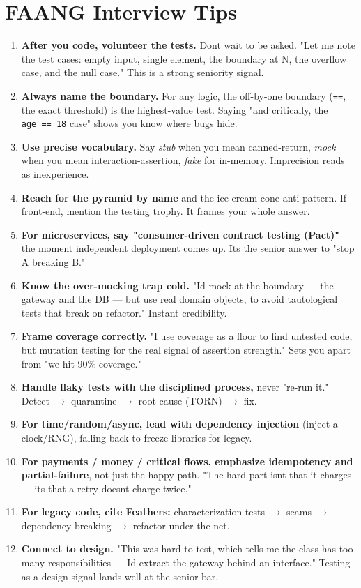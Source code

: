 \documentclass[11pt]{article}
\begin{document}
\section{FAANG Interview Tips}\label{faang-interview-tips}

\begin{enumerate}
\def\labelenumi{\arabic{enumi}.}
\item
  \textbf{After you code, volunteer the tests.} Don\textquotesingle t wait to be asked. "Let me note the test cases: empty input, single element, the boundary at N, the overflow case, and the null case." This is a strong seniority signal.
\item
  \textbf{Always name the boundary.} For any logic, the off-by-one boundary (\texttt{==}, the exact threshold) is the highest-value test. Saying "and critically, the \texttt{age\ ==\ 18} case" shows you know where bugs hide.
\item
  \textbf{Use precise vocabulary.} Say \emph{stub} when you mean canned-return, \emph{mock} when you mean interaction-assertion, \emph{fake} for in-memory. Imprecision reads as inexperience.
\item
  \textbf{Reach for the pyramid by name} and the ice-cream-cone anti-pattern. If front-end, mention the testing trophy. It frames your whole answer.
\item
  \textbf{For microservices, say "consumer-driven contract testing (Pact)"} the moment independent deployment comes up. It\textquotesingle s the senior answer to "stop A breaking B."
\item
  \textbf{Know the over-mocking trap cold.} "I\textquotesingle d mock at the boundary --- the gateway and the DB --- but use real domain objects, to avoid tautological tests that break on refactor." Instant credibility.
\item
  \textbf{Frame coverage correctly.} "I use coverage as a floor to find untested code, but mutation testing for the real signal of assertion strength." Sets you apart from "we hit 90\% coverage."
\item
  \textbf{Handle flaky tests with the disciplined process,} never "re-run it." Detect \(\rightarrow\) quarantine \(\rightarrow\) root-cause (TORN) \(\rightarrow\) fix.
\item
  \textbf{For time/random/async, lead with dependency injection} (inject a clock/RNG), falling back to freeze-libraries for legacy.
\item
  \textbf{For payments / money / critical flows, emphasize idempotency and partial-failure}, not just the happy path. "The hard part isn\textquotesingle t that it charges --- it\textquotesingle s that a retry doesn\textquotesingle t charge twice."
\item
  \textbf{For legacy code, cite Feathers:} characterization tests \(\rightarrow\) seams \(\rightarrow\) dependency-breaking \(\rightarrow\) refactor under the net.
\item
  \textbf{Connect to design.} "This was hard to test, which tells me the class has too many responsibilities --- I\textquotesingle d extract the gateway behind an interface." Testing as a design signal lands well at the senior bar.
\end{enumerate}
\end{document}
